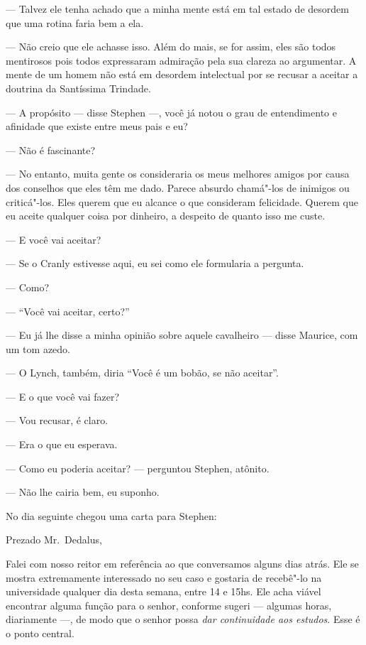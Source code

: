 --- Talvez ele tenha achado que a minha mente está em tal estado
de desordem que uma rotina faria bem a ela.

--- Não creio que ele achasse isso.  Além do mais, se for assim,
eles são todos mentirosos pois todos expressaram admiração pela sua
clareza ao argumentar.  A mente de um homem não está em desordem
intelectual por se recusar a aceitar a doutrina da Santíssima Trindade.

--- A propósito --- disse Stephen ---, você já notou o grau de
entendimento e afinidade que existe entre meus pais e eu?

--- Não é fascinante?

--- No entanto, muita gente os consideraria os meus melhores
amigos por causa dos conselhos que eles têm me dado.  Parece absurdo
chamá"-los de inimigos ou criticá"-los.  Eles querem que eu alcance o que
consideram felicidade.  Querem que eu aceite qualquer coisa por
dinheiro, a despeito de quanto isso me custe.

--- E você vai aceitar?

--- Se o Cranly estivesse aqui, eu sei como ele formularia a
pergunta.

--- Como?

--- “Você vai aceitar, certo?”

--- Eu já lhe disse a minha opinião sobre aquele cavalheiro ---
disse Maurice, com um tom azedo.

--- O Lynch, também, diria “Você é um bobão, se não aceitar”.

--- E o que você vai fazer?

--- Vou recusar, é claro.

--- Era o que eu esperava.

--- Como eu poderia aceitar? --- perguntou Stephen, atônito.

--- Não lhe cairia bem, eu suponho.

No dia seguinte chegou uma carta para Stephen:


\bigskip

\noindent Prezado Mr.~Dedalus,\smallskip

Falei com nosso reitor em referência ao que conversamos alguns dias
atrás.  Ele se mostra extremamente interessado no seu caso e gostaria
de recebê"-lo na universidade qualquer dia desta semana, entre 14 e
15hs.  Ele acha viável encontrar alguma função para o senhor, conforme
sugeri --- algumas horas, diariamente ---, de modo que o senhor possa
\textit{dar continuidade aos estudos}.  Esse é o ponto central.

